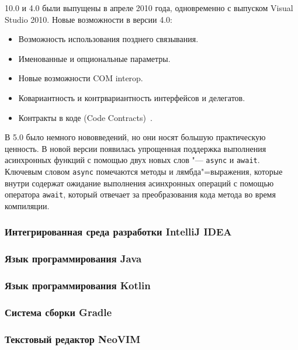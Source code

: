 \vbnet{} 10.0 и \csharp{} 4.0 были выпущены в апреле 2010 года, одновременно с выпуском Visual Studio 2010.
Новые возможности в версии 4.0:
\begin{itemize}
  \item Возможность использования позднего связывания.
  \item Именованные и опциональные параметры.
  \item Новые возможности COM interop.
  \item Ковариантность и контрвариантность интерфейсов и делегатов.
  \item Контракты в коде (Code Contracts)~\cite{csharp_wiki_2013_ru}.
\end{itemize}

В \csharp{} 5.0 было немного нововведений, но они носят большую практическую ценность.
В новой версии появилась упрощенная поддержка выполнения асинхронных функций с помощью двух новых слов "---  \lstinline[style=csharpinlinestyle]!async! и \lstinline[style=csharpinlinestyle]!await!.
Ключевым словом \lstinline[style=csharpinlinestyle]!async! помечаются методы и лямбда"=выражения, которые внутри содержат ожидание выполнения асинхронных операций с помощью оператора \lstinline[style=csharpinlinestyle]!await!, который отвечает за преобразования кода метода во время компиляции.

\subsubsection{Интегрированная среда разработки IntelliJ IDEA}
\label{subsub:intellij_idea}

\subsubsection{Язык программирования Java}
\label{subsub:kotlin}

\subsubsection{Язык программирования Kotlin}
\label{subsub:kotlin}

\subsubsection{Система сборки Gradle}
\label{subsub:gradle}

\subsubsection{Текстовый редактор NeoVIM}
\label{subsub:neovim}
